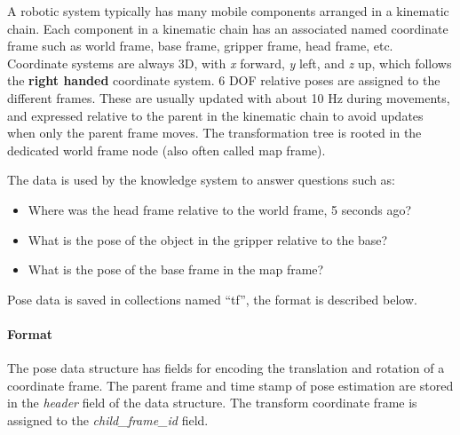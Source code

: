 
A robotic system typically has many mobile components arranged in a kinematic chain.
Each component in a kinematic chain has an associated named coordinate frame such as
world frame, base frame, gripper frame, head frame, etc.
Coordinate systems are always 3D, with \emph{x} forward, \emph{y} left, and \emph{z} up, which follows the \textbf{right handed} coordinate system.
6 DOF relative poses are assigned to the different frames.
These are usually updated with about 10 Hz during movements, and
expressed relative to the 
parent in the kinematic chain to avoid updates when only the parent frame moves.
The transformation tree is rooted in the dedicated world frame node
(also often called map frame).

The data is used by the \ease knowledge system to answer questions such as:
\begin{itemize}
 \item Where was the head frame relative to the world frame, 5 seconds ago?
 \item What is the pose of the object in the gripper relative to the base?
 \item What is the pose of the base frame in the map frame? 
\end{itemize}


Pose data is saved in \mongodb collections named ``tf'', the format is described below.

\paragraph{Format}
The pose data structure has
fields for encoding the translation and rotation of a coordinate frame.
The parent frame and time stamp of pose estimation
are stored in the \emph{header} field of the data structure.
The transform coordinate frame is assigned to the \emph{child\_frame\_id} field. \\



